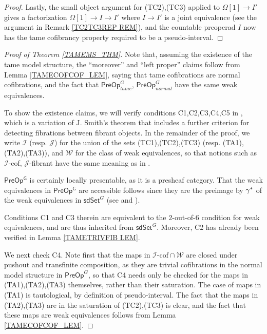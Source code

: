 \documentclass[a4paper,10pt
,draft
]{article}%
\numberwithin{equation}{section}
\numberwithin{figure}{section}
\theoremstyle{definition} %
\newcommand{\1}{\ensuremath{\mathbbm 1}}%
\begin{document}
\begin{proof}
Lastly, the small object argument for 
(TC2),(TC3) applied to 
$\Omega[1] \to I'$
gives a factorization 
$\Omega[1] \to I \to I'$
where $I \to I'$ is a joint equivalence
(see the argument in Remark \ref{TC2TC3REP REM}),
and the countable preoperad $I$
now has the tame cofibrancy property required 
to be a pseudo-interval. %
\end{proof}



\begin{proof}[Proof of Theorem \ref{TAMEMS_THM}]
	Note that, assuming the existence of the tame model structure,
	the ``moreover'' and ``left proper'' claims
	follow from Lemma \ref{TAMECOFCOF_LEM},
	saying that tame cofibrations are normal cofibrations,
	and the fact that
	$\mathsf{PreOp}^{G}_{tame}$, 
	$\mathsf{PreOp}^{G}_{normal}$
	have the same weak equivalences.
	
	
	To show the existence claims, we will verify conditions C1,C2,C3,C4,C5 in 
	\cite[Prop. 2.3]{Sta14},
	which is a variation of 
	J. Smith's theorem \cite[Thm. 1.7]{Bek00}
	that includes a further criterion for detecting 
	fibrations between fibrant objects.
	In the remainder of the proof,
	we write $\mathcal{I}$ (resp. $\mathcal{J}$)
	for the union of the sets 
	(TC1),(TC2),(TC3)
	(resp. (TA1),(TA2),(TA3)),
	and $\mathcal{W}$ for the class of weak equivalences,
	so that notions such as 
	$\mathcal{I}$-cof, $\mathcal{J}$-fibrant
	have the same meaning as in \cite{Sta14}.
	
	$\mathsf{PreOp^G}$ is certainly locally presentable, 
	as it is a presheaf category.
	That the weak equivalences in $\mathsf{PreOp^G}$ are accessible follows since they are the preimage by $\gamma^{\**}$ of the weak equivalences in 
	$\mathsf{sdSet}^G$ 
	(see \cite[Cor. A.2.6.5]{Lur09} and \cite[Cor. A.2.6.6]{Lur09}).
	
	Conditions C1 and C3 therein are equivalent to the $2$-out-of-$6$
	condition for weak equivalences, and are thus inherited 
	from $\mathsf{sdSet}^G$.
	Moreover, C2 has already been verified in Lemma \ref{TAMETRIVFIB LEM}. 


We next check C4. 
Note first that the maps in 
$\mathcal{I} \text{-cof} \cap \mathcal{W}$
are closed under pushout and transfinite composition, as they are trivial cofibrations in the normal model structure in 
$\mathsf{PreOp}^G$,
so that C4 needs only be checked for the maps in (TA1),(TA2),(TA3) themselves, rather than their saturation.
The case of maps in (TA1) is tautological, by definition
of pseudo-interval.
The fact that the maps in 
(TA2),(TA3) are in the saturation of (TC2),(TC3) is clear, and the fact that these maps are weak equivalences follows from 
Lemma \ref{TAMECOFCOF_LEM}.


\end{proof}
\end{document}
